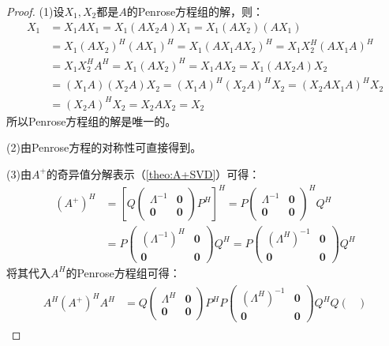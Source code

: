 \begin{proof}
	(1)设$X_1,X_2$都是$A$的Penrose方程组的解，则：
	\begin{align*}
		X_1
		&=X_1AX_1=X_1(AX_2A)X_1=X_1(AX_2)(AX_1) \\
		&=X_1(AX_2)^H(AX_1)^H=X_1(AX_1AX_2)^H=X_1X_2^H(AX_1A)^H \\
		&=X_1X_2^HA^H=X_1(AX_2)^H=X_1AX_2=X_1(AX_2A)X_2 \\
		&=(X_1A)(X_2A)X_2=(X_1A)^H(X_2A)^HX_2=(X_2AX_1A)^HX_2 \\
		&=(X_2A)^HX_2=X_2AX_2=X_2
	\end{align*}
	所以Penrose方程组的解是唯一的。\par
	(2)由Penrose方程的对称性可直接得到。\par
	(3)由$A^+$的奇异值分解表示（\cref{theo:A+SVD}）可得：
	\begin{align*}
		(A^+)^H&=\left[Q
		\begin{pmatrix}
			\varLambda^{-1} & \mathbf{0} \\
			\mathbf{0} & \mathbf{0}
		\end{pmatrix}P^H\right]^H
		=P
		\begin{pmatrix}
			\varLambda^{-1} & \mathbf{0} \\
			\mathbf{0} & \mathbf{0}
		\end{pmatrix}^HQ^H \\
		&=P
		\begin{pmatrix}
			(\varLambda^{-1})^H & \mathbf{0} \\
			\mathbf{0} & \mathbf{0}
		\end{pmatrix}Q^H
		=P
		\begin{pmatrix}
			(\varLambda^H)^{-1} & \mathbf{0} \\
			\mathbf{0} & \mathbf{0}
		\end{pmatrix}Q^H
	\end{align*}
	将其代入$A^H$的Penrose方程组可得：
	\begin{gather*}
		\begin{aligned}
			A^H(A^+)^HA^H
			&=Q
			\begin{pmatrix}
				\varLambda^H & \mathbf{0} \\
				\mathbf{0} & \mathbf{0}
			\end{pmatrix}
			P^HP
			\begin{pmatrix}
				(\varLambda^H)^{-1} & \mathbf{0} \\
				\mathbf{0} & \mathbf{0}
			\end{pmatrix}
			Q^HQ
			\begin{pmatrix}

\end{pmatrix}
\end{aligned}
\end{gather*}
\end{proof}
